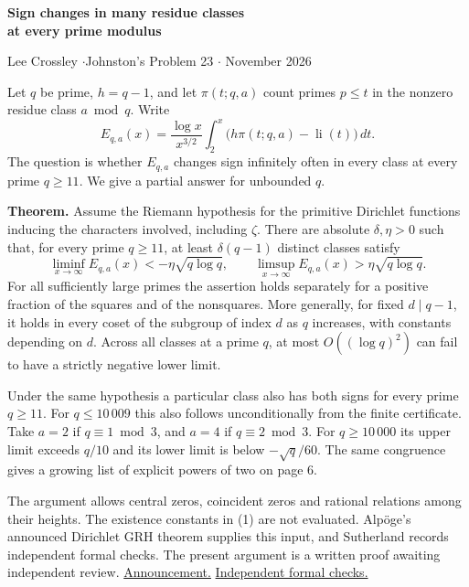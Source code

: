 \documentclass[11pt,a4paper]{article}
\newcommand{\li}{\operatorname{li}}
\begin{document}
\begin{center}
{\Large\bfseries Sign changes in many residue classes\\[2pt]at every prime modulus\par}
\vspace{6pt}
{Lee Crossley \quad$\cdot$\quad Johnston's Problem 23 \quad$\cdot$ November 2026}
\end{center}

Let \(q\) be prime, \(h=q-1\), and let \(\pi(t;q,a)\) count primes \(p\le t\) in
the nonzero residue class \(a\bmod q\). Write
\[
 E_{q,a}(x)=\frac{\log x}{x^{3/2}}\int_2^x\bigl(h\pi(t;q,a)-\li(t)\bigr)\,dt .
\]
The question is whether \(E_{q,a}\) changes sign infinitely often in every class at every
prime \(q\ge11\). We give a partial answer for unbounded \(q\).

\textbf{Theorem.} Assume the Riemann hypothesis for the primitive Dirichlet functions
inducing the characters involved, including \(\zeta\). There are absolute
\(\delta,\eta>0\) such that, for every prime \(q\ge11\), at least \(\delta(q-1)\)
distinct classes satisfy
\begin{equation}
 \liminf_{x\to\infty}E_{q,a}(x)<-\eta\sqrt{q\log q},
 \qquad \limsup_{x\to\infty}E_{q,a}(x)>\eta\sqrt{q\log q}.
\end{equation}
For all sufficiently large primes the assertion holds separately for a positive
fraction of the squares and of the nonsquares. More generally, for fixed \(d\mid q-1\),
it holds in every coset of the subgroup of index \(d\) as \(q\) increases, with
constants depending on \(d\). Across all classes at a prime \(q\), at most
\(O((\log q)^2)\) can fail to have a strictly negative lower limit.

Under the same hypothesis a particular class also has both signs for every prime \(q\ge11\). For \(q\le10\,009\) this also follows unconditionally from the finite certificate. Take \(a=2\) if
\(q\equiv1\bmod3\), and \(a=4\) if \(q\equiv2\bmod3\). For \(q\ge10\,000\)
its upper limit exceeds \(q/10\) and its lower limit is below \(-\sqrt q/60\).
The same congruence gives a growing list of explicit powers of two on page 6.

The argument allows central zeros, coincident zeros and rational relations among
their heights. The existence constants in (1) are not evaluated. Alpöge's announced Dirichlet
GRH theorem supplies this input, and Sutherland records independent formal checks.
The present argument is a written proof awaiting independent review.
\href{https://alpo.ge/remark.pdf}{Announcement.} \href{https://math.mit.edu/~drew/grh/}{Independent formal checks.}
\end{document}
